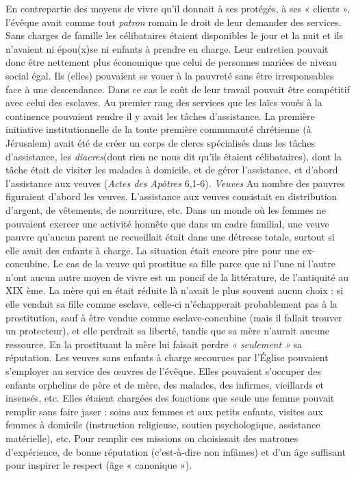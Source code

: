  En contrepartie des moyens de vivre qu'il donnait à ses protégés, à ses « clients », l'évêque avait comme tout \emph{patron} romain le droit de leur demander des services. Sans charges de famille les célibataires étaient disponibles le jour et la nuit et ils n'avaient ni épou(x)se ni enfants à prendre en charge. Leur entretien pouvait donc être nettement plus économique que celui de personnes mariées de niveau social égal. Ils (elles) pouvaient se vouer à la pauvreté sans être irresponsables face à une descendance. Dans ce cas le coût de leur travail pouvait être compétitif avec celui des esclaves. Au premier rang des services que les laïcs voués à la continence pouvaient rendre il y avait les tâches d'assistance. La première initiative institutionnelle de la toute première communauté chrétienne (à Jérusalem) avait été de créer un corps de clercs spécialisés dans les tâches d'assistance, les \emph{diacres}(dont rien ne nous dit qu'ils étaient célibataires), dont la tâche était de visiter les malades à domicile, et de gérer l'assistance, et d'abord l'assistance aux veuves (\emph{Actes des Apôtres} 6,1-6). 
\emph{Veuves
}Au nombre des pauvres figuraient d'abord les veuves. L'assistance aux veuves consistait en distribution d'argent, de vêtements, de nourriture, etc. Dans un monde où les femmes ne pouvaient exercer une activité honnête que dans un cadre familial, une veuve pauvre qu'aucun parent ne recueillait était dans une détresse totale, surtout si elle avait des enfants à charge. 
 La situation était encore pire pour une ex-concubine. Le cas de la veuve qui prostitue sa fille parce que ni l'une ni l'autre n'ont aucun autre moyen de vivre est un poncif de la littérature, de l'antiquité au XIX ème. La mère qui en était réduite là n'avait le plus souvent aucun choix : si elle vendait sa fille comme esclave, celle-ci n'échapperait probablement pas à la prostitution, sauf à être vendue comme esclave-concubine (mais il fallait trouver un protecteur), et elle perdrait sa liberté, tandis que sa mère n'aurait aucune ressource. En la prostituant la mère lui faisait perdre \emph{« seulement »} sa réputation. 
 Les veuves sans enfants à charge secourues par l'Église pouvaient s'employer au service des œuvres de l'évêque. Elles pouvaient s'occuper des enfants orphelins de père et de mère, des malades, des infirmes, vieillards et insensés, etc. Elles étaient chargées des fonctions que seule une femme pouvait remplir sans faire jaser : soins aux femmes et aux petits enfants, visites aux femmes à domicile (instruction religieuse, soutien psychologique, assistance matérielle), etc. Pour remplir ces missions on choisissait des matrones d'expérience, de bonne réputation (c'est-à-dire non infâmes) et d'un âge suffisant pour inspirer le respect (âge « canonique »). 
